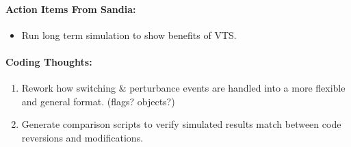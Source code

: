 \documentclass[12pt]{article}
\begin{document}
\begin{multicols}{2}
\paragraph{Action Items From Sandia:}
	\begin{itemize}
		\itemsep 0em 
			\item Run long term simulation to show benefits of VTS.
	\end{itemize}
	

\vfill\null
\columnbreak

\paragraph{Coding Thoughts:} 
	\begin{enumerate}

		\itemsep 0em 
		\item Rework how switching \& perturbance events are handled into a more flexible and general format. (flags? objects?)
		\item Generate comparison scripts to verify simulated results match  between code reversions and modifications.
		


\end{enumerate}
\end{multicols}
\end{document}
